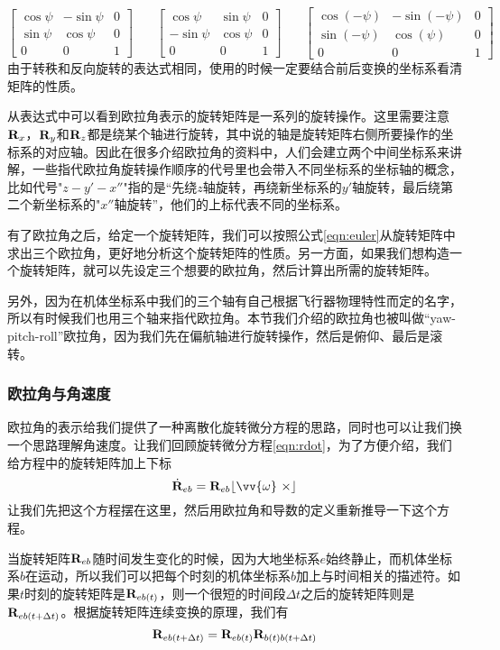 \documentclass[11pt]{article}
\begin{document}
$$
\begin{bmatrix}
\cos\psi & - \sin\psi & 0\\
\sin\psi & \cos\psi & 0\\
0 & 0 & 1
\end{bmatrix}
\ \ \ \  \ \ \ \
\begin{bmatrix}
\cos\psi & \sin\psi & 0\\
-\sin\psi & \cos\psi & 0\\
0 & 0 & 1
\end{bmatrix} 
\ \ \ \  \ \ \ \
\begin{bmatrix}
\cos(-\psi) & -\sin(-\psi) & 0\\
\sin(-\psi) & \cos(\psi) & 0\\
0 & 0 & 1
\end{bmatrix} 
$$
由于转秩和反向旋转的表达式相同，使用的时候一定要结合前后变换的坐标系看清矩阵的性质。

从表达式中可以看到欧拉角表示的旋转矩阵是一系列的旋转操作。这里需要注意${\bf R}_x$，${\bf R}_y$和${\bf R}_z$都是绕某个轴进行旋转，其中说的轴是旋转矩阵右侧所要操作的坐标系的对应轴。因此在很多介绍欧拉角的资料中，人们会建立两个中间坐标系来讲解，一些指代欧拉角旋转操作顺序的代号里也会带入不同坐标系的坐标轴的概念，比如代号"$z-y'-x''$"指的是“先绕$z$轴旋转，再绕新坐标系的$y'$轴旋转，最后绕第二个新坐标系的"$x''$轴旋转”，他们的上标代表不同的坐标系。

有了欧拉角之后，给定一个旋转矩阵，我们可以按照公式\ref{eqn:euler}从旋转矩阵中求出三个欧拉角，更好地分析这个旋转矩阵的性质。另一方面，如果我们想构造一个旋转矩阵，就可以先设定三个想要的欧拉角，然后计算出所需的旋转矩阵。

另外，因为在机体坐标系中我们的三个轴有自己根据飞行器物理特性而定的名字，所以有时候我们也用三个轴来指代欧拉角。本节我们介绍的欧拉角也被叫做“yaw-pitch-roll”欧拉角，因为我们先在偏航轴进行旋转操作，然后是俯仰、最后是滚转。

\subsubsection{欧拉角与角速度}\label{sec:eulerandangular}
欧拉角的表示给我们提供了一种离散化旋转微分方程的思路，同时也可以让我们换一个思路理解角速度。让我们回顾旋转微分方程\ref{eqn:rdot}，为了方便介绍，我们给方程中的旋转矩阵加上下标
$$
\dot{{\bf R}}_{eb} = {\bf R}_{eb}\lfloor \vv{\omega} \ \times \rfloor
$$
让我们先把这个方程摆在这里，然后用欧拉角和导数的定义重新推导一下这个方程。

当旋转矩阵${\bf R}_{eb}$随时间发生变化的时候，因为大地坐标系$e$始终静止，而机体坐标系$b$在运动，所以我们可以把每个时刻的机体坐标系$b$加上与时间相关的描述符。如果$t$时刻的旋转矩阵是${\bf R}_{eb(t)}$，则一个很短的时间段$\Delta t$之后的旋转矩阵则是${\bf R}_{eb(t+\Delta t)}$。根据旋转矩阵连续变换的原理，我们有
\begin{equation}\label{eqn:discreterot}
{\bf R}_{eb(t+\Delta t)} = {\bf R}_{eb(t)}{\bf R}_{b(t)b(t+\Delta t)}
\end{equation}
\end{document}
